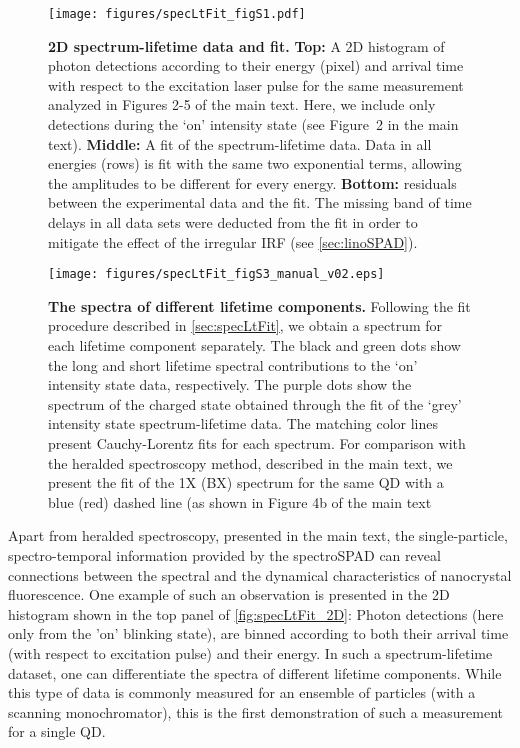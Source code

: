 \documentclass[journal=nalefd, manuscript=letter, layout=twocolumn]{achemso}
\begin{document}
\begin{figure}[h]
    \centering
    \texttt{[image: figures/specLtFit\_figS1.pdf]}
    \caption{\textbf{2D spectrum-lifetime data and fit.}
    \textbf{Top:} A 2D histogram of photon detections according to their energy (pixel) and arrival time with respect to the excitation laser pulse for the same measurement analyzed in Figures 2-5 of the main text. Here, we include only detections during the `on' intensity state (see Figure~2 in the main text). \textbf{Middle:} A fit of the spectrum-lifetime data. Data in all energies (rows) is fit with the same two exponential terms, allowing the amplitudes to be different for every energy. \textbf{Bottom:} residuals between the experimental data and the fit. The missing band of time delays in all data sets were deducted from the fit in order to mitigate the effect of the irregular IRF (see \autoref{sec:linoSPAD}).}
    \label{fig:specLtFit_2D}
\end{figure}

\begin{figure}[h]
    \centering
    \texttt{[image: figures/specLtFit\_figS3\_manual\_v02.eps]}
    \caption{\textbf{The spectra of different lifetime components.}
    Following the fit procedure described in \autoref{sec:specLtFit}, we obtain a spectrum for each lifetime component separately. The black and green dots show the long and short lifetime spectral contributions to the `on' intensity state data, respectively. The purple dots show the spectrum of the charged state obtained through the fit of the `grey' intensity state spectrum-lifetime data. The matching color lines present Cauchy-Lorentz fits for each spectrum. For comparison with the heralded spectroscopy method, described in the main text, we present the fit of the 1X (BX) spectrum for the same QD with a blue (red) dashed line (as shown in Figure 4b of the main text}
    \label{fig:specLtFit_spectra}
\end{figure}
Apart from heralded spectroscopy, presented in the main text, the single-particle, spectro-temporal information provided by the spectroSPAD can reveal connections between the spectral and the dynamical characteristics of nanocrystal fluorescence. One example of such an observation is presented in the 2D histogram shown in the top panel of \autoref{fig:specLtFit_2D}: Photon detections (here only from the 'on' blinking state), are binned according to both their arrival time (with respect to excitation pulse) and their energy. In such a spectrum-lifetime dataset, one can differentiate the spectra of different lifetime components. While this type of data is commonly measured for an ensemble of particles (with a scanning monochromator), this is the first demonstration of such a measurement for a single QD. 
\end{document}

